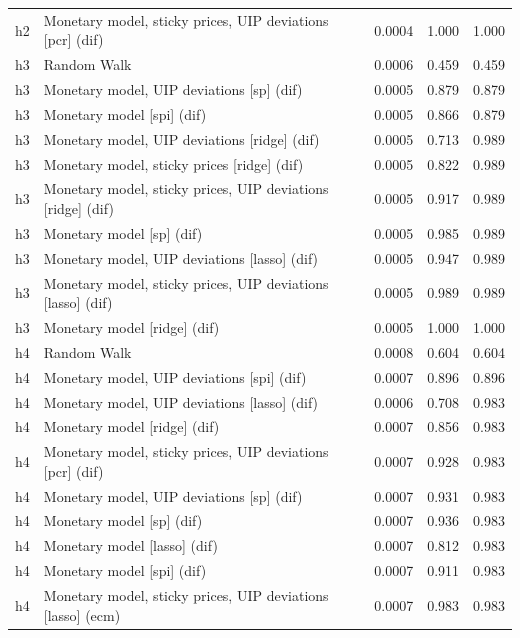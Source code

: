 \begin{ThreePartTable}
\begin{longtable}[t]{cp{5.5cm}ccc}
h2 & \raggedright Monetary model, sticky prices, UIP deviations [pcr] (dif) & 0.0004 & 1.000 & 1.000\\
\addlinespace
h3 & \raggedright Random Walk & 0.0006 & 0.459 & 0.459\\
h3 & \raggedright Monetary model, UIP deviations [sp] (dif) & 0.0005 & 0.879 & 0.879\\
h3 & \raggedright Monetary model [spi] (dif) & 0.0005 & 0.866 & 0.879\\
h3 & \raggedright Monetary model, UIP deviations [ridge] (dif) & 0.0005 & 0.713 & 0.989\\
h3 & \raggedright Monetary model, sticky prices [ridge] (dif) & 0.0005 & 0.822 & 0.989\\
h3 & \raggedright Monetary model, sticky prices, UIP deviations [ridge] (dif) & 0.0005 & 0.917 & 0.989\\
h3 & \raggedright Monetary model [sp] (dif) & 0.0005 & 0.985 & 0.989\\
h3 & \raggedright Monetary model, UIP deviations [lasso] (dif) & 0.0005 & 0.947 & 0.989\\
h3 & \raggedright Monetary model, sticky prices, UIP deviations [lasso] (dif) & 0.0005 & 0.989 & 0.989\\
h3 & \raggedright Monetary model [ridge] (dif) & 0.0005 & 1.000 & 1.000\\
\addlinespace
h4 & \raggedright Random Walk & 0.0008 & 0.604 & 0.604\\
h4 & \raggedright Monetary model, UIP deviations [spi] (dif) & 0.0007 & 0.896 & 0.896\\
h4 & \raggedright Monetary model, UIP deviations [lasso] (dif) & 0.0006 & 0.708 & 0.983\\
h4 & \raggedright Monetary model [ridge] (dif) & 0.0007 & 0.856 & 0.983\\
h4 & \raggedright Monetary model, sticky prices, UIP deviations [pcr] (dif) & 0.0007 & 0.928 & 0.983\\
h4 & \raggedright Monetary model, UIP deviations [sp] (dif) & 0.0007 & 0.931 & 0.983\\
h4 & \raggedright Monetary model [sp] (dif) & 0.0007 & 0.936 & 0.983\\
h4 & \raggedright Monetary model [lasso] (dif) & 0.0007 & 0.812 & 0.983\\
h4 & \raggedright Monetary model [spi] (dif) & 0.0007 & 0.911 & 0.983\\
h4 & \raggedright Monetary model, sticky prices, UIP deviations [lasso] (ecm) & 0.0007 & 0.983 & 0.983\\

\end{longtable}
\end{ThreePartTable}
